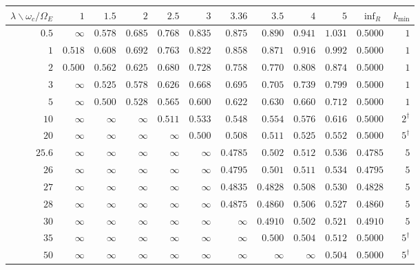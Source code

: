 \documentclass[11pt]{article}
\newcommand{\OmE}{\Omega_E}
\theoremstyle{definition}
\theoremstyle{remark}
\begin{document}
\begin{table}[t]
\centering
\scriptsize
\setlength{\tabcolsep}{2.4pt}
\renewcommand{\arraystretch}{1.1}
\begin{tabular}{@{}rrrrrrrrrrrr@{}}
\toprule
$\lambda\backslash\omega_c/\OmE$ & $1$ & $1.5$ & $2$ & $2.5$ & $3$ & $3.36$ & $3.5$ & $4$ & $5$ &
$\inf_R$ & $k_{\min}$\\
\midrule
$0.5$ & $\infty$ & $0.578$ & $0.685$ & $0.768$ & $0.835$ & $0.875$ & $0.890$ & $0.941$ &
$1.031$ & $0.5000$ & $1$\\
$1$ & $0.518$ & $0.608$ & $0.692$ & $0.763$ & $0.822$ & $0.858$ & $0.871$ & $0.916$ &
$0.992$ & $0.5000$ & $1$\\
$2$ & $0.500$ & $0.562$ & $0.625$ & $0.680$ & $0.728$ & $0.758$ & $0.770$ & $0.808$ &
$0.874$ & $0.5000$ & $1$\\
$3$ & $\infty$ & $0.525$ & $0.578$ & $0.626$ & $0.668$ & $0.695$ & $0.705$ & $0.739$ &
$0.799$ & $0.5000$ & $1$\\
$5$ & $\infty$ & $0.500$ & $0.528$ & $0.565$ & $0.600$ & $0.622$ & $0.630$ & $0.660$ &
$0.712$ & $0.5000$ & $1$\\
$10$ & $\infty$ & $\infty$ & $\infty$ & $0.511$ & $0.533$ & $0.548$ & $0.554$ & $0.576$ &
$0.616$ & $0.5000$ & $2^\dagger$\\
$20$ & $\infty$ & $\infty$ & $\infty$ & $\infty$ & $0.500$ & $0.508$ & $0.511$ & $0.525$ &
$0.552$ & $0.5000$ & $5^\dagger$\\
$25.6$ & $\infty$ & $\infty$ & $\infty$ & $\infty$ & $\infty$ & $0.4785$ & $0.502$ &
$0.512$ & $0.536$ & $0.4785$ & $5$\\
$26$ & $\infty$ & $\infty$ & $\infty$ & $\infty$ & $\infty$ & $0.4795$ & $0.501$ &
$0.511$ & $0.534$ & $0.4795$ & $5$\\
$27$ & $\infty$ & $\infty$ & $\infty$ & $\infty$ & $\infty$ & $0.4835$ & $0.4828$ &
$0.508$ & $0.530$ & $0.4828$ & $5$\\
$28$ & $\infty$ & $\infty$ & $\infty$ & $\infty$ & $\infty$ & $0.4875$ & $0.4860$ &
$0.506$ & $0.527$ & $0.4860$ & $5$\\
$30$ & $\infty$ & $\infty$ & $\infty$ & $\infty$ & $\infty$ & $\infty$ & $0.4910$ &
$0.502$ & $0.521$ & $0.4910$ & $5$\\
$35$ & $\infty$ & $\infty$ & $\infty$ & $\infty$ & $\infty$ & $\infty$ & $0.500$ &
$0.504$ & $0.512$ & $0.5000$ & $5^\dagger$\\
$50$ & $\infty$ & $\infty$ & $\infty$ & $\infty$ & $\infty$ & $\infty$ & $\infty$ &
$\infty$ & $0.504$ & $0.5000$ & $5^\dagger$\\

\end{tabular}
\end{table}
\end{document}

